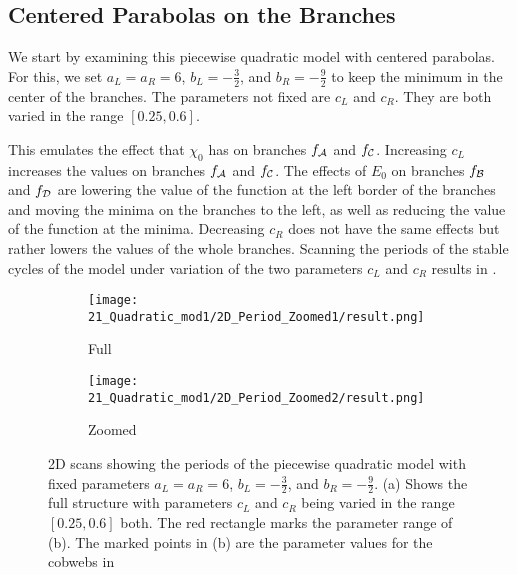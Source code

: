 \subsection{Centered Parabolas on the Branches}
\label{sec:setup.quad.even}

We start by examining this piecewise quadratic model with centered parabolas.
For this, we set $a_L = a_R = 6$, $b_L = -\frac{3}{2}$, and $b_R = -\frac{9}{2}$ to keep the minimum in the center of the branches.
The parameters not fixed are $c_L$ and $c_R$.
They are both varied in the range $[0.25, 0.6]$.

This emulates the effect that $\chi_0$ has on branches $f_{\mathcal{A}}$ and $f_{\mathcal{C}}$.
Increasing $c_L$ increases the values on branches $f_{\mathcal{A}}$ and $f_{\mathcal{C}}$.
The effects of $E_0$ on branches $f_{\mathcal{B}}$ and $f_{\mathcal{D}}$ are lowering the value of the function at the left border of the branches and moving the minima on the branches to the left, as well as reducing the value of the function at the minima.
Decreasing $c_R$ does not have the same effects but rather lowers the values of the whole branches.
Scanning the periods of the stable cycles of the model under variation of the two parameters $c_L$ and $c_R$ results in .

\begin{figure}
	\centering
	\begin{subfigure}{0.4\textwidth}
		\centering
		\texttt{[image: 21\_Quadratic\_mod1/2D\_Period\_Zoomed1/result.png]}
		\caption{Full}
		\label{fig:setup.quad.even.period.full}
	\end{subfigure}
	\begin{subfigure}{0.4\textwidth}
		\centering
		\texttt{[image: 21\_Quadratic\_mod1/2D\_Period\_Zoomed2/result.png]}
		\caption{Zoomed}
		\label{fig:setup.quad.even.period.zoomed}
	\end{subfigure}
	\caption[2D scans showing periods of the even piecewise quadratic model]{
		2D scans showing the periods of the piecewise quadratic model with fixed parameters $a_L = a_R = 6$, $b_L = -\frac{3}{2}$, and $b_R = -\frac{9}{2}$.
		(a) Shows the full structure with parameters $c_L$ and $c_R$ being varied in the range $[0.25, 0.6]$ both.
		The red rectangle marks the parameter range of (b).
		The marked points in (b) are the parameter values for the cobwebs in 
	}
\end{figure}

